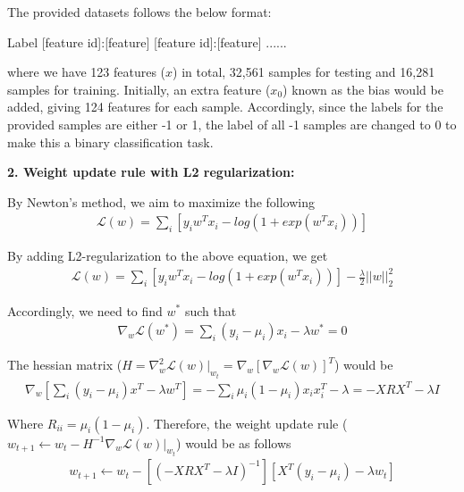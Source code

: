 \documentclass[12pt,a4paper]{article}
\begin{document}
	\noindent The provided datasets follows the below format:
	\begin{center}
		Label [feature id]:[feature] [feature id]:[feature] ......
	\end{center}
	where we have 123 features ($x$) in total, 32,561 samples for testing and 16,281 samples for training. Initially, an extra feature ($x_0$) known as the bias would be added, giving 124 features for each sample. Accordingly, since the labels for the provided samples are either -1 or 1, the label of all -1 samples are changed to 0 to make this a binary classification task.
	
	\vspace{0.4cm}
	\noindent \textbf{2. Weight update rule with L2 regularization:}  
	\vspace{0.2cm}
	
	\noindent By Newton's method, we aim to maximize the following
	\begin{align}
		\mathcal{L}(w) = \sum_{i}[y_iw^Tx_i-log(1+exp(w^Tx_i))]
	\end{align}
	
	\vspace{-0.2cm}
	\noindent By adding L2-regularization to the above equation, we get
	\begin{align}
	\mathcal{L}(w) = \sum_{i}[y_iw^Tx_i-log(1+exp(w^Tx_i))] - \frac{\lambda}{2}||w||^2_2
	\end{align}
	
	\vspace{-0.2cm}
	\noindent Accordingly, we need to find $w^*$ such that 
	\begin{align}
	\nabla_w\mathcal{L}(w^*) = \sum_{i}(y_i-\mu_i)x_i - \lambda w^*=0
	\end{align}
	
	\vspace{-0.2cm}
	\noindent The hessian matrix ($	H = \nabla^2_w\mathcal{L}(w)|_{w_t} = \nabla_w[\nabla_w\mathcal{L}(w)]^T$) would be
	\begin{align}
		\nabla_w[\sum_{i}(y_i-\mu_i)x^T - \lambda w^T]= -\sum_i\mu_i(1-\mu_i)x_ix^T_i  - \lambda = -XRX^T - \lambda I
	\end{align}
	
	\vspace{-0.2cm}
	\noindent Where $R_{ii}= \mu_i(1-\mu_i)$. Therefore, the weight update rule ($w_{t+1} \leftarrow w_t - H^{-1}\nabla_w\mathcal{L}(w)|_{w_t}$) would be as follows
	\begin{align}
		w_{t+1}\leftarrow w_t - [(-XRX^T - \lambda I)^{-1}][X^T(y_i-\mu_i) - \lambda w_t]
	\end{align}
	
\end{document}
